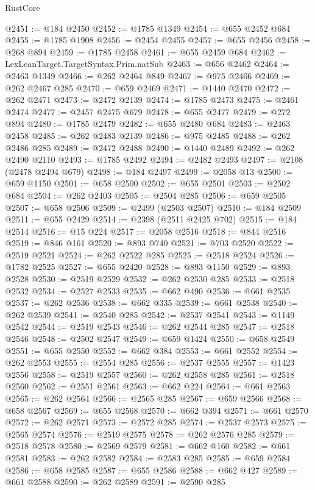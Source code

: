 \begin{lexlean}{RustCore}
\begin{coremodule}
@2451 := @184 @2450
@2452 := @1785 @1349
@2454 := @655 @2452 @684
@2455 := @1785 @1908
@2456 := @2454 @2455
@2457 := @655 @2456
@2458 := @268 @894
@2459 := @1785 @2458
@2461 := @655 @2459 @684
@2462 := LexLeanTarget.TargetSyntax.Prim.natSub
@2463 := @656 @2462
@2464 := @2463 @1349
@2466 := @262 @2464 @849
@2467 := @975 @2466
@2469 := @262 @2467 @285
@2470 := @659 @2469
@2471 := @1440 @2470
@2472 := @262 @2471
@2473 := @2472 @2139
@2474 := @1785 @2473
@2475 := @2461 @2474
@2477 := @2457 @2475 @679
@2478 := @655 @2477
@2479 := @272 @894
@2480 := @1785 @2479
@2482 := @655 @2480 @684
@2483 := @2463 @2458
@2485 := @262 @2483 @2139
@2486 := @975 @2485
@2488 := @262 @2486 @285
@2489 := @2472 @2488
@2490 := @1440 @2489
@2492 := @262 @2490 @2110
@2493 := @1785 @2492
@2494 := @2482 @2493
@2497 := @2108 (@2478 @2494 @679)
@2498 := @184 @2497
@2499 := @2058 @13
@2500 := @659 @1150
@2501 := @658 @2500
@2502 := @655 @2501
@2503 := @2502 @684
@2504 := @262 @2403
@2505 := @2504 @285
@2506 := @659 @2505
@2507 := @658 @2506
@2509 := @2499 (@2503 @2507)
@2510 := @184 @2509
@2511 := @655 @2429
@2514 := @2398 (@2511 @2425 @702)
@2515 := @184 @2514
@2516 := @15 @224
@2517 := @2058 @2516
@2518 := @844 @2516
@2519 := @846 @161
@2520 := @893 @740
@2521 := @703 @2520
@2522 := @2519 @2521
@2524 := @262 @2522 @285
@2525 := @2518 @2524
@2526 := @1782 @2525
@2527 := @655 @2420
@2528 := @893 @1150
@2529 := @893 @2528
@2530 := @2519 @2529
@2532 := @262 @2530 @285
@2533 := @2518 @2532
@2534 := @2527 @2533
@2535 := @662 @490
@2536 := @661 @2535
@2537 := @262 @2536
@2538 := @662 @335
@2539 := @661 @2538
@2540 := @262 @2539
@2541 := @2540 @285
@2542 := @2537 @2541
@2543 := @1149 @2542
@2544 := @2519 @2543
@2546 := @262 @2544 @285
@2547 := @2518 @2546
@2548 := @2502 @2547
@2549 := @659 @1424
@2550 := @658 @2549
@2551 := @655 @2550
@2552 := @662 @384
@2553 := @661 @2552
@2554 := @262 @2553
@2555 := @2554 @285
@2556 := @2537 @2555
@2557 := @1423 @2556
@2558 := @2519 @2557
@2560 := @262 @2558 @285
@2561 := @2518 @2560
@2562 := @2551 @2561
@2563 := @662 @224
@2564 := @661 @2563
@2565 := @262 @2564
@2566 := @2565 @285
@2567 := @659 @2566
@2568 := @658 @2567
@2569 := @655 @2568
@2570 := @662 @394
@2571 := @661 @2570
@2572 := @262 @2571
@2573 := @2572 @285
@2574 := @2537 @2573
@2575 := @2565 @2574
@2576 := @2519 @2575
@2578 := @262 @2576 @285
@2579 := @2518 @2578
@2580 := @2569 @2579
@2581 := @662 @160
@2582 := @661 @2581
@2583 := @262 @2582
@2584 := @2583 @285
@2585 := @659 @2584
@2586 := @658 @2585
@2587 := @655 @2586
@2588 := @662 @427
@2589 := @661 @2588
@2590 := @262 @2589
@2591 := @2590 @285

\end{coremodule}
\end{lexlean}
